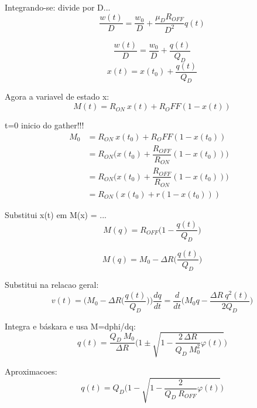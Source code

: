 \documentclass{ceel}
\begin{document}
\begin{multicols}{2}
Integrando-se: divide por D...
\begin{equation}\label{}
\dfrac{w(t)}{D}=\dfrac{w_0}{D}+\dfrac{\mu_D R_{OFF}}{D^2}q(t)
\end{equation}

\begin{equation}\label{}
\dfrac{w(t)}{D}=\dfrac{w_0}{D}+\dfrac{q(t)}{Q_D}
\end{equation}
\begin{equation}\label{}
x(t)=x(t_0)+\dfrac{q(t)}{Q_D}
\end{equation}

Agora a variavel de estado x:
\begin{equation}\label{}
M(t)=R_{ON}\ x(t)+ R_OFF(1-x(t))
\end{equation}

t=0 inicio do gather!!!
\begin{align}\label{}
M_0&=R_{ON}\ x(t_0)+ R_OFF(1-x(t_0))&\\
    &=R_{ON}\Bigg( x(t_0)+ \dfrac{R_{OFF}}{R_{ON}} (1-x(t_0))\Bigg)&\\
    &=R_{ON}\Bigg( x(t_0)+ \dfrac{R_{OFF}}{R_{ON}} (1-x(t_0))\Bigg)&\\
    &=R_{ON}( x(t_0)+ r (1-x(t_0)))&
\end{align}

Substitui x(t) em M(x) = ...
\begin{equation}\label{}%
M(q)=R_{OFF}\Bigg( 1-\dfrac{q(t)}{Q_D}\Bigg)
\end{equation}

\begin{equation}\label{}%
M(q)=M_0-\Delta R\Bigg(\dfrac{q(t)}{Q_D}\Bigg)
\end{equation}

Substitui na relacao geral:
\begin{equation}\label{}
v(t)=\bigg(M_0-\Delta R\Big(\dfrac{q(t)}{Q_D}\Big)\bigg)\dfrac{dq}{dt} = \dfrac{d}{dt} \bigg(M_0 q-\dfrac{\Delta R\ q^2(t)}{2 Q_D}\bigg)
\end{equation}

Integra e báskara e usa M=dphi/dq:
\begin{equation}\label{}
q(t)=\dfrac{Q_D\ M_0}{\Delta R}\Bigg(1\pm\sqrt{1-\dfrac{2\, \Delta R}{Q_D\ M^2_0}\varphi(t)}\Bigg)
\end{equation} 

Aproximacoes:
\begin{equation}\label{}
q(t)=Q_D\Bigg(1-\sqrt{1-\dfrac{2}{Q_D\ R_{OFF}}\varphi(t)}\Bigg)
\end{equation} 


\end{multicols}
\end{document}
